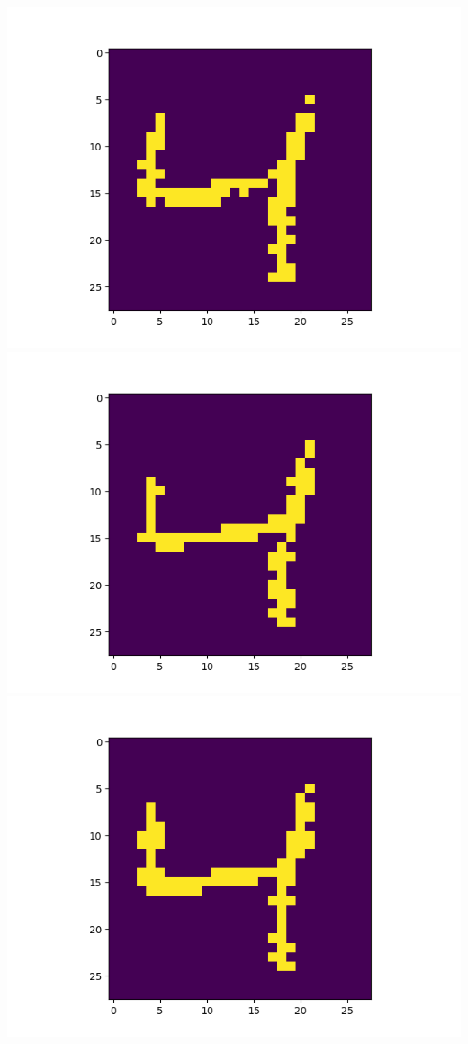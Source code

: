 \includegraphics[scale=0.2]{./bilder/comparison/prob/13}
\includegraphics[scale=0.2]{./bilder/comparison/prob/14}
\includegraphics[scale=0.2]{./bilder/comparison/prob/15}
